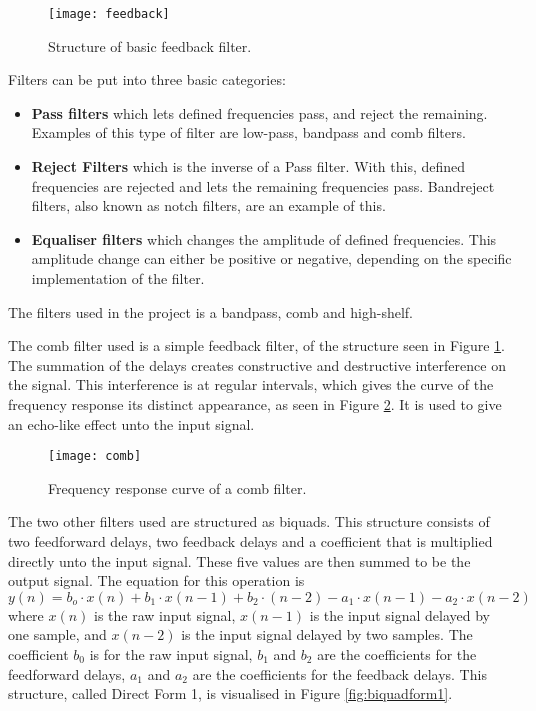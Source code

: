 \begin{figure}
\centering
\texttt{[image: feedback]}
\caption{Structure of basic feedback filter.}
\label{fig:feedback}
\end{figure}

Filters can be put into three basic categories:
\begin{itemize}
\item \textbf{Pass filters} which lets defined frequencies pass, and reject the remaining. Examples of this type of filter are low-pass, bandpass and comb filters.
\item \textbf{Reject Filters} which is the inverse of a Pass filter. With this, defined frequencies are rejected and lets the remaining frequencies pass. Bandreject filters, also known as notch filters, are an example of this.
\item \textbf{Equaliser filters} which changes the amplitude of defined frequencies. This amplitude change can either be positive or negative, depending on the specific implementation of the filter. 
\end{itemize}

The filters used in the project is a bandpass, comb and high-shelf.

The comb filter used is a simple feedback filter, of the structure seen in Figure \ref{fig:feedback}. The summation of the delays creates constructive and destructive interference on the signal. This interference is at regular intervals, which gives the curve of the frequency response its distinct appearance, as seen in Figure \ref{fig:comb}. It is used to give an echo-like effect unto the input signal.

\begin{figure}
\centering
\texttt{[image: comb]}
\caption{Frequency response curve of a comb filter.}
\label{fig:comb}
\end{figure}

The two other filters used are structured as biquads. This structure consists of two feedforward delays, two feedback delays and a coefficient that is multiplied directly unto the input signal. These five values are then summed to be the output signal. The equation for this operation is 
\[y(n) = b_o \cdot x(n) + b_1 \cdot x(n-1) + b_2 \cdot (n-2) - a_1 \cdot x(n-1) - a_2 \cdot x(n-2)\] \cite{Redmon2003}
where \(x(n)\) is the raw input signal, \(x(n-1)\) is the input signal delayed by one sample, and \(x(n-2)\) is the input signal delayed by two samples. The coefficient \(b_0\) is for the raw input signal, \(b_1\) and \(b_2\) are the coefficients for the feedforward delays, \(a_1\) and \(a_2\) are the coefficients for the feedback delays. This structure, called Direct Form 1, is visualised in Figure \ref{fig:biquadform1}.

